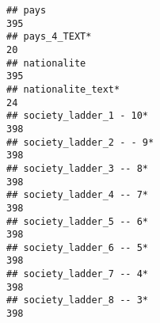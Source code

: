 \documentclass[
]{article}
\begin{document}
\begin{verbatim}
## pays                                                                                                                                                                                                                       395
## pays_4_TEXT*                                                                                                                                                                                                                20
## nationalite                                                                                                                                                                                                                395
## nationalite_text*                                                                                                                                                                                                           24
## society_ladder_1 - 10*                                                                                                                                                                                                     398
## society_ladder_2 - - 9*                                                                                                                                                                                                    398
## society_ladder_3 -- 8*                                                                                                                                                                                                     398
## society_ladder_4 -- 7*                                                                                                                                                                                                     398
## society_ladder_5 -- 6*                                                                                                                                                                                                     398
## society_ladder_6 -- 5*                                                                                                                                                                                                     398
## society_ladder_7 -- 4*                                                                                                                                                                                                     398
## society_ladder_8 -- 3*                                                                                                                                                                                                     398

\end{verbatim}
\end{document}

